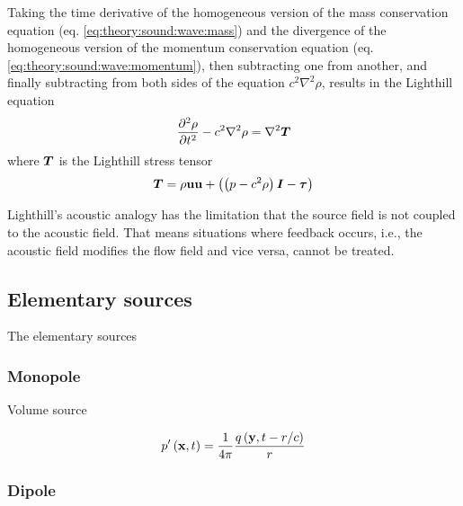 
Taking the time derivative of the homogeneous version of the mass conservation
equation (eq. \ref{eq:theory:sound:wave:mass}) and the divergence of the
homogeneous version of the momentum conservation equation (eq.
\ref{eq:theory:sound:wave:momentum}), then subtracting one from another, and
finally subtracting from both sides of the equation $c^2 \nabla^2 \rho$, results in the Lighthill
equation
\begin{equation}
  \frac{\partial^2 \rho}{\partial t^2} - c^2 \nabla^2 \rho = \nabla^2 \bm{T}
\end{equation}
where $\bm{T}$ is the Lighthill stress tensor
\begin{equation}
  \bm{T} = \rho \mathbf{u}\mathbf{u} + \left( \left( p - c^2 \rho \right) \bm{I} - \bm{\tau}  \right)
\end{equation}

Lighthill's acoustic analogy has the limitation that the source field is not
coupled to the acoustic field. That means situations where feedback occurs,
i.e., the acoustic field modifies the flow field and vice versa, cannot be
treated.

\subsection{Elementary sources}

The elementary sources 


\subsubsection*{Monopole}

Volume source
%

\begin{equation}
 p' \left(\mathbf{x},t\right) = \frac{1}{4\pi} \frac{q \left(\mathbf{y}, t-r/c\right)}{r}
\end{equation}

\subsubsection*{Dipole}

